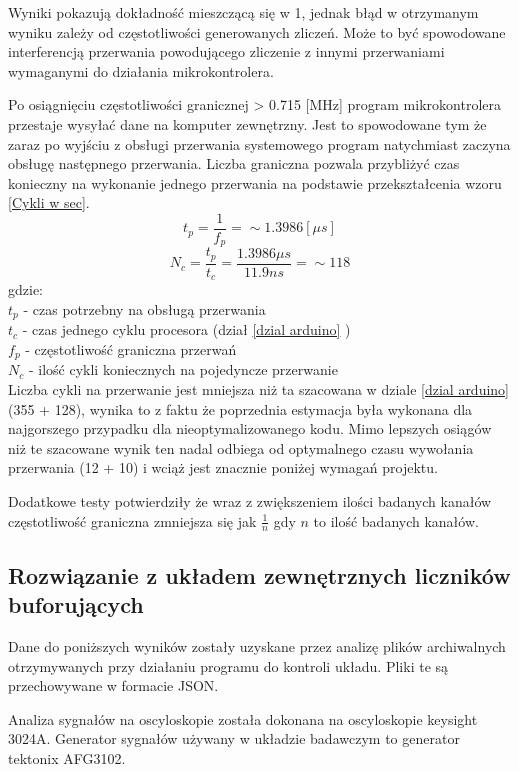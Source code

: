 Wyniki pokazują dokładność mieszczącą się w  1\textperthousand, 
jednak błąd w otrzymanym wyniku zależy od częstotliwości generowanych zliczeń.
Może to być spowodowane interferencją przerwania powodującego zliczenie z innymi przerwaniami wymaganymi do działania mikrokontrolera.

Po osiągnięciu częstotliwości granicznej > 0.715 [MHz] program mikrokontrolera przestaje wysyłać dane na komputer zewnętrzny.
Jest to spowodowane tym że zaraz po wyjściu z obsługi przerwania systemowego program natychmiast zaczyna obsługę następnego przerwania. 
Liczba graniczna pozwala przybliżyć czas konieczny na wykonanie jednego przerwania na podstawie przekształcenia wzoru \ref{Cykli w sec}. 
$$ t_p = \frac{1}{f_p} = \sim 1.3986 [\mu s] $$
$$ N_c = \frac{t_p}{t_c} =  \frac{1.3986 \mu s}{11.9 ns} =\sim 118$$
gdzie: \\
        \indent $t_p$ -  czas potrzebny na obsługą przerwania\\
        \indent $t_c$ -  czas jednego cyklu procesora (dział \ref{dzial arduino} ) \\
        \indent $f_p$ -  częstotliwość graniczna przerwań \\
        \indent $N_c$ -  ilość cykli koniecznych na pojedyncze przerwanie \\

Liczba cykli na przerwanie jest mniejsza niż ta szacowana w dziale \ref{dzial arduino} (355 + 128)\cite{ard_opt_git}, wynika to z faktu że poprzednia estymacja była wykonana dla najgorszego przypadku dla nieoptymalizowanego kodu.
Mimo lepszych osiągów niż te szacowane wynik ten nadal odbiega od optymalnego czasu wywołania przerwania (12 + 10) \cite{interupt latency} i wciąż jest znacznie poniżej wymagań projektu. 

Dodatkowe testy potwierdziły że wraz z zwiększeniem ilości badanych kanałów częstotliwość graniczna zmniejsza się jak $\frac{1}{n}$ gdy $n$ to ilość badanych kanałów. 

\subsection{Rozwiązanie z układem zewnętrznych liczników buforujących}

Dane do poniższych wyników zostały uzyskane przez analizę plików archiwalnych otrzymywanych przy działaniu programu do kontroli układu.
Pliki te są przechowywane w formacie JSON.

Analiza sygnałów na oscyloskopie została dokonana na oscyloskopie keysight 3024A. Generator sygnałów używany w układzie badawczym to generator tektonix AFG3102.

